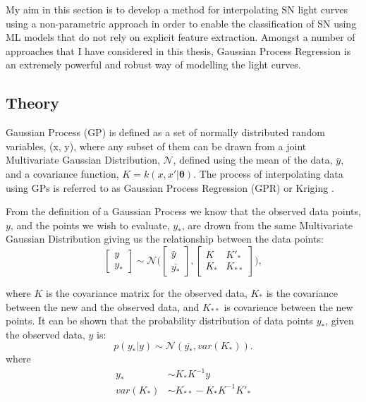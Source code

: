 My aim in this section is to develop a method for interpolating SN light curves using a non-parametric approach in order to enable the classification of SN using ML models that do not rely on explicit feature extraction. Amongst a number of approaches that I have considered in this thesis, Gaussian Process Regression is an extremely powerful and robust way of modelling the light curves.

\subsection{Theory}
Gaussian Process (GP) \citep{Rasmussen2006} is defined as a set of normally distributed random variables, (x, y), where any subset of them can be drawn from a joint Multivariate Gaussian Distribution, $\mathcal{N}$, defined using the mean of the data, $\bar{y}$, and a covariance function, $K = k(x, x'|\mathbf{\theta})$. The process of interpolating data using GPs is referred to as Gaussian Process Regression (GPR) or Kriging \citep{krige1951,Rasmussen2006,Ebden2015}.

From the definition of a Gaussian Process we know that the observed data points, $y$, and the points we wish to evaluate, $y_*$, are drown from the same Multivariate Gaussian Distribution giving us the relationship between the data points:
\begin{equation}
\begin{bmatrix} y \\ y_* \end{bmatrix} \sim \mathcal{N}\Biggl(\begin{bmatrix} \bar{y} \\ \bar{y_*} \end{bmatrix},\begin{bmatrix} K & K'_*\\
 K_* & K_{**} \end{bmatrix}\Biggr),
\end{equation}

\noindent where $K$ is the covariance matrix for the observed data, $K_*$ is the covariance between the new and the observed data, and $K_{**}$ is covarience between the new points. It can be shown \citep{Rasmussen2006} that the probability distribution of data points $y_*$, given the observed data, $y$ is:
\begin{equation}
p(y_*|y) \sim \mathcal{N}(\bar{y_*},var(K_*)).
\end{equation}
\noindent where
\begin{align}
y_* &\sim K_*K^{-1}y \\
var(K_*) &\sim K_{**}-K_*K^{-1}K'_*
\end{align}

